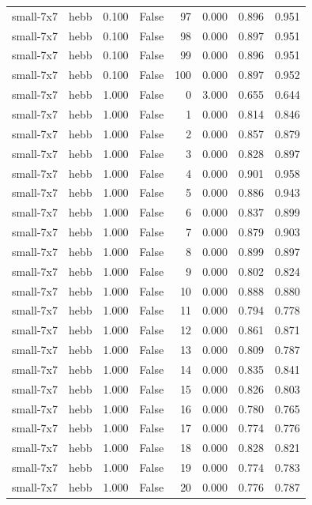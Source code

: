 \begin{tabular}{llrrrrrr}
small-7x7 & hebb & 0.100 & False & 97 & 0.000 & 0.896 & 0.951 \\
small-7x7 & hebb & 0.100 & False & 98 & 0.000 & 0.897 & 0.951 \\
small-7x7 & hebb & 0.100 & False & 99 & 0.000 & 0.896 & 0.951 \\
small-7x7 & hebb & 0.100 & False & 100 & 0.000 & 0.897 & 0.952 \\
small-7x7 & hebb & 1.000 & False & 0 & 3.000 & 0.655 & 0.644 \\
small-7x7 & hebb & 1.000 & False & 1 & 0.000 & 0.814 & 0.846 \\
small-7x7 & hebb & 1.000 & False & 2 & 0.000 & 0.857 & 0.879 \\
small-7x7 & hebb & 1.000 & False & 3 & 0.000 & 0.828 & 0.897 \\
small-7x7 & hebb & 1.000 & False & 4 & 0.000 & 0.901 & 0.958 \\
small-7x7 & hebb & 1.000 & False & 5 & 0.000 & 0.886 & 0.943 \\
small-7x7 & hebb & 1.000 & False & 6 & 0.000 & 0.837 & 0.899 \\
small-7x7 & hebb & 1.000 & False & 7 & 0.000 & 0.879 & 0.903 \\
small-7x7 & hebb & 1.000 & False & 8 & 0.000 & 0.899 & 0.897 \\
small-7x7 & hebb & 1.000 & False & 9 & 0.000 & 0.802 & 0.824 \\
small-7x7 & hebb & 1.000 & False & 10 & 0.000 & 0.888 & 0.880 \\
small-7x7 & hebb & 1.000 & False & 11 & 0.000 & 0.794 & 0.778 \\
small-7x7 & hebb & 1.000 & False & 12 & 0.000 & 0.861 & 0.871 \\
small-7x7 & hebb & 1.000 & False & 13 & 0.000 & 0.809 & 0.787 \\
small-7x7 & hebb & 1.000 & False & 14 & 0.000 & 0.835 & 0.841 \\
small-7x7 & hebb & 1.000 & False & 15 & 0.000 & 0.826 & 0.803 \\
small-7x7 & hebb & 1.000 & False & 16 & 0.000 & 0.780 & 0.765 \\
small-7x7 & hebb & 1.000 & False & 17 & 0.000 & 0.774 & 0.776 \\
small-7x7 & hebb & 1.000 & False & 18 & 0.000 & 0.828 & 0.821 \\
small-7x7 & hebb & 1.000 & False & 19 & 0.000 & 0.774 & 0.783 \\
small-7x7 & hebb & 1.000 & False & 20 & 0.000 & 0.776 & 0.787 \\

\end{tabular}
